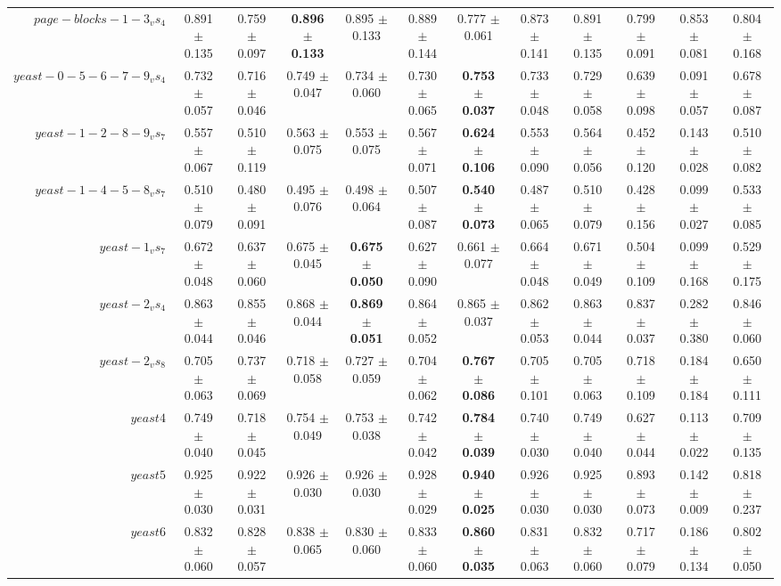 \begin{table}[!ht]
{\begin{tabular}{r c c c c c c c c c c c}
$page-blocks-1-3_vs_4$ & 0.891 $\pm$ 0.135 & 0.759 $\pm$ 0.097 & \textbf{0.896 $\pm$ 0.133} & 0.895 $\pm$ 0.133 & 0.889 $\pm$ 0.144 & 0.777 $\pm$ 0.061 & 0.873 $\pm$ 0.141 & 0.891 $\pm$ 0.135 & 0.799 $\pm$ 0.091 & 0.853 $\pm$ 0.081 & 0.804 $\pm$ 0.168 \\
$yeast-0-5-6-7-9_vs_4$ & 0.732 $\pm$ 0.057 & 0.716 $\pm$ 0.046 & 0.749 $\pm$ 0.047 & 0.734 $\pm$ 0.060 & 0.730 $\pm$ 0.065 & \textbf{0.753 $\pm$ 0.037} & 0.733 $\pm$ 0.048 & 0.729 $\pm$ 0.058 & 0.639 $\pm$ 0.098 & 0.091 $\pm$ 0.057 & 0.678 $\pm$ 0.087 \\
$yeast-1-2-8-9_vs_7$ & 0.557 $\pm$ 0.067 & 0.510 $\pm$ 0.119 & 0.563 $\pm$ 0.075 & 0.553 $\pm$ 0.075 & 0.567 $\pm$ 0.071 & \textbf{0.624 $\pm$ 0.106} & 0.553 $\pm$ 0.090 & 0.564 $\pm$ 0.056 & 0.452 $\pm$ 0.120 & 0.143 $\pm$ 0.028 & 0.510 $\pm$ 0.082 \\
$yeast-1-4-5-8_vs_7$ & 0.510 $\pm$ 0.079 & 0.480 $\pm$ 0.091 & 0.495 $\pm$ 0.076 & 0.498 $\pm$ 0.064 & 0.507 $\pm$ 0.087 & \textbf{0.540 $\pm$ 0.073} & 0.487 $\pm$ 0.065 & 0.510 $\pm$ 0.079 & 0.428 $\pm$ 0.156 & 0.099 $\pm$ 0.027 & 0.533 $\pm$ 0.085 \\
$yeast-1_vs_7$ & 0.672 $\pm$ 0.048 & 0.637 $\pm$ 0.060 & 0.675 $\pm$ 0.045 & \textbf{0.675 $\pm$ 0.050} & 0.627 $\pm$ 0.090 & 0.661 $\pm$ 0.077 & 0.664 $\pm$ 0.048 & 0.671 $\pm$ 0.049 & 0.504 $\pm$ 0.109 & 0.099 $\pm$ 0.168 & 0.529 $\pm$ 0.175 \\
$yeast-2_vs_4$ & 0.863 $\pm$ 0.044 & 0.855 $\pm$ 0.046 & 0.868 $\pm$ 0.044 & \textbf{0.869 $\pm$ 0.051} & 0.864 $\pm$ 0.052 & 0.865 $\pm$ 0.037 & 0.862 $\pm$ 0.053 & 0.863 $\pm$ 0.044 & 0.837 $\pm$ 0.037 & 0.282 $\pm$ 0.380 & 0.846 $\pm$ 0.060 \\
$yeast-2_vs_8$ & 0.705 $\pm$ 0.063 & 0.737 $\pm$ 0.069 & 0.718 $\pm$ 0.058 & 0.727 $\pm$ 0.059 & 0.704 $\pm$ 0.062 & \textbf{0.767 $\pm$ 0.086} & 0.705 $\pm$ 0.101 & 0.705 $\pm$ 0.063 & 0.718 $\pm$ 0.109 & 0.184 $\pm$ 0.184 & 0.650 $\pm$ 0.111 \\
$yeast4$ & 0.749 $\pm$ 0.040 & 0.718 $\pm$ 0.045 & 0.754 $\pm$ 0.049 & 0.753 $\pm$ 0.038 & 0.742 $\pm$ 0.042 & \textbf{0.784 $\pm$ 0.039} & 0.740 $\pm$ 0.030 & 0.749 $\pm$ 0.040 & 0.627 $\pm$ 0.044 & 0.113 $\pm$ 0.022 & 0.709 $\pm$ 0.135 \\
$yeast5$ & 0.925 $\pm$ 0.030 & 0.922 $\pm$ 0.031 & 0.926 $\pm$ 0.030 & 0.926 $\pm$ 0.030 & 0.928 $\pm$ 0.029 & \textbf{0.940 $\pm$ 0.025} & 0.926 $\pm$ 0.030 & 0.925 $\pm$ 0.030 & 0.893 $\pm$ 0.073 & 0.142 $\pm$ 0.009 & 0.818 $\pm$ 0.237 \\
$yeast6$ & 0.832 $\pm$ 0.060 & 0.828 $\pm$ 0.057 & 0.838 $\pm$ 0.065 & 0.830 $\pm$ 0.060 & 0.833 $\pm$ 0.060 & \textbf{0.860 $\pm$ 0.035} & 0.831 $\pm$ 0.063 & 0.832 $\pm$ 0.060 & 0.717 $\pm$ 0.079 & 0.186 $\pm$ 0.134 & 0.802 $\pm$ 0.050 \\

\end{tabular}}
\end{table}
